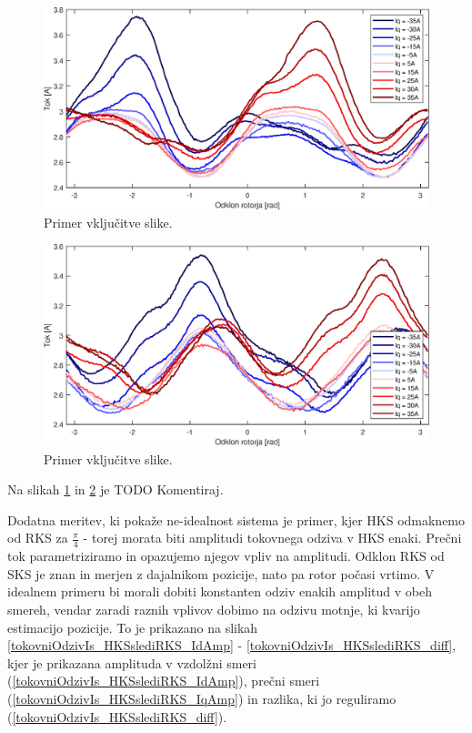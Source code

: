 \documentclass[a4paper,twoside,openright,12pt,slovene]{book}
\begin{document}
\begin{figure}[!htbp]
    \centering
    \includegraphics[width=1\columnwidth]{Slike/tokovniOdzivIs_IdAmp.eps}
    \caption{\label{tokovniOdzivIs_IdAmp} Primer vključitve slike.}
\end{figure}

\begin{figure}[!htbp]
    \centering
    \includegraphics[width=1\columnwidth]{Slike/tokovniOdzivIs_IqAmp.eps}
    \caption{\label{tokovniOdzivIs_IqAmp} Primer vključitve slike.}
\end{figure}

Na slikah \ref{tokovniOdzivIs_IdAmp} in \ref{tokovniOdzivIs_IqAmp} je TODO Komentiraj.

Dodatna meritev, ki pokaže ne-idealnost sistema je primer, kjer HKS odmaknemo od RKS za $\frac{\pi}{4}$ - torej morata biti amplitudi tokovnega odziva v HKS enaki. Prečni tok parametriziramo in
opazujemo njegov vpliv na amplitudi. Odklon RKS od SKS je znan in merjen z dajalnikom pozicije, nato pa rotor počasi vrtimo.  V idealnem primeru bi morali dobiti konstanten odziv enakih amplitud v
obeh smereh, vendar zaradi raznih vplivov dobimo na odzivu motnje, ki kvarijo estimacijo pozicije. To je prikazano na slikah \ref{tokovniOdzivIs_HKSslediRKS_IdAmp} -
\ref{tokovniOdzivIs_HKSslediRKS_diff}, kjer je prikazana amplituda v vzdolžni smeri (\ref{tokovniOdzivIs_HKSslediRKS_IdAmp}), prečni smeri (\ref{tokovniOdzivIs_HKSslediRKS_IqAmp}) in razlika, ki jo
reguliramo (\ref{tokovniOdzivIs_HKSslediRKS_diff}). 
\end{document}
